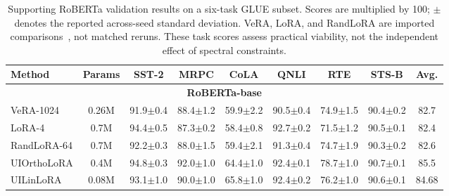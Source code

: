 
\begin{table}[ht]
\centering
\caption{Supporting RoBERTa validation results on a six-task GLUE subset. Scores are multiplied by 100; $\pm$ denotes the reported across-seed standard deviation. VeRA, LoRA, and RandLoRA are imported comparisons~\citep{albert2025randlora}, not matched reruns. These task scores assess practical viability, not the independent effect of spectral constraints.}
\label{tab:glue_results_base_large}
\begin{adjustbox}{max width=\linewidth}
\begin{tabular}{@{}lcccccccc@{}}
\toprule
\textbf{Method} & \textbf{Params} & \textbf{SST-2} & \textbf{MRPC} & \textbf{CoLA} & \textbf{QNLI} & \textbf{RTE} & \textbf{STS-B} & \textbf{Avg.} \\
\midrule

\multicolumn{9}{c}{\textbf{RoBERTa-base}} \\
\midrule
VeRA-1024   & 0.26M & 91.9{\scriptsize$\pm$0.4} & 88.4{\scriptsize$\pm$1.2} & 59.9{\scriptsize$\pm$2.2} & 90.5{\scriptsize$\pm$0.4} & 74.9{\scriptsize$\pm$1.5} & 90.4{\scriptsize$\pm$0.2} & 82.7  \\
LoRA-4      & 0.7M  & 94.4{\scriptsize$\pm$0.5} & 87.3{\scriptsize$\pm$0.2} & 58.4{\scriptsize$\pm$0.8} & 92.7{\scriptsize$\pm$0.2} & 71.5{\scriptsize$\pm$1.2} & 90.5{\scriptsize$\pm$0.1} & 82.4  \\
RandLoRA-64 & 0.7M  & 92.2{\scriptsize$\pm$0.3} & 88.0{\scriptsize$\pm$1.5} & 59.4{\scriptsize$\pm$2.1} & 91.3{\scriptsize$\pm$0.4} & 74.7{\scriptsize$\pm$1.9} & 90.3{\scriptsize$\pm$0.2} & 82.6  \\
\addlinespace
UIOrthoLoRA & 0.4M  & 94.8{\scriptsize$\pm$0.3} & 92.0{\scriptsize$\pm$1.0} & 64.4{\scriptsize$\pm$1.0} & 92.4{\scriptsize$\pm$0.1} & 78.7{\scriptsize$\pm$1.0} & 90.7{\scriptsize$\pm$0.1} & 85.5 \\
UILinLoRA   & 0.08M & 93.1{\scriptsize$\pm$1.0} & 90.0{\scriptsize$\pm$1.0} & 65.8{\scriptsize$\pm$1.0} & 92.4{\scriptsize$\pm$0.2} & 76.2{\scriptsize$\pm$1.0} & 90.6{\scriptsize$\pm$0.1} & 84.68 \\


\end{tabular}
\end{adjustbox}
\end{table}
